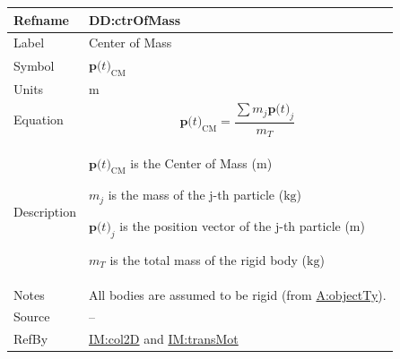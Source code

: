 \documentclass[12pt]{article}
\begin{document}
\vspace{\baselineskip}
\noindent
\begin{minipage}{\textwidth}
\begin{tabular}{>{\raggedright}p{}>{\raggedright\arraybackslash}p{}}
\toprule \textbf{Refname} & \textbf{DD:ctrOfMass}
\label{DD:ctrOfMass}
\\ \midrule
Label & Center of Mass
        
\\ \midrule
Symbol & ${\symbf{p}\text{(}t\text{)}_{\text{CM}}}$
         
\\ \midrule
Units & ${\text{m}}$
        
\\ \midrule
Equation & \begin{displaymath}
           {\symbf{p}\text{(}t\text{)}_{\text{CM}}}=\frac{\displaystyle\sum{{m_{j}} {\symbf{p}\text{(}t\text{)}_{j}}}}{{m_{T}}}
           \end{displaymath}
\\ \midrule
Description & \begin{symbDescription}
              \item{${\symbf{p}\text{(}t\text{)}_{\text{CM}}}$ is the Center of Mass (${\text{m}}$)}
              \item{${m_{j}}$ is the mass of the j-th particle (${\text{kg}}$)}
              \item{${\symbf{p}\text{(}t\text{)}_{j}}$ is the position vector of the j-th particle (${\text{m}}$)}
              \item{${m_{T}}$ is the total mass of the rigid body (${\text{kg}}$)}
              \end{symbDescription}
\\ \midrule
Notes & All bodies are assumed to be rigid (from \hyperref[assumpOT]{A:objectTy}).
        
\\ \midrule
Source & --
         
\\ \midrule
RefBy & \hyperref[IM:col2D]{IM:col2D} and \hyperref[IM:transMot]{IM:transMot}
        
\\ \bottomrule
\end{tabular}
\end{minipage}
\end{document}
